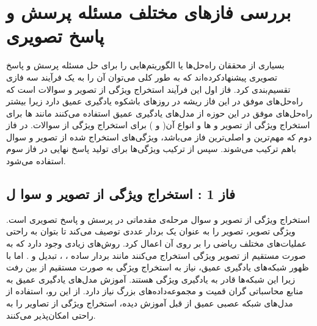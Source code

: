 \section{بررسی فازهای مختلف مسئله پرسش و پاسخ تصویری}
{
بسیاری از محققان راه‌حل‌ها یا الگوریتم‌هایی را برای حل مسئله پرسش و پاسخ تصویری پیشنهاد‌کرده‌اند که به طور کلی می‌توان آن را به یک فرآیند سه فازی تقسیم‌بندی کرد. فاز اول این فرآیند استخراج ویژگی از تصویر و سوالات است که راه‌حل‌های موفق در این فاز ریشه در روزهای باشکوه یادگیری عمیق دارد زیرا بیشتر راه‌حل‌های موفق در این حوزه از مدل‌های یادگیری عمیق استفاده می‌کنند مانند 
 ها برای استخراج ویژگی از  تصویر و 
  ها و انواع آن(
  و
  ) برای استخراج ویژگی از سوالات. در فاز دوم که مهم‌ترین و اصلی‌ترین فاز می‌باشد، ویژگی‌های استخراج شده از تصویر و سوال باهم ترکیب می‌شوند. سپس از ترکیب ویژگی‌ها برای تولید پاسخ نهایی در فاز سوم استفاده می‌شود.
	\subsection{فاز 1 : استخراج ویژگی از تصویر و سوا ل}
	{
		استخراج ویژگی از تصویر و سوال مرحله‌ی مقدماتی در پرسش و پاسخ تصویری است. ویژگی تصویر، تصویر را به عنوان یک بردار عددی  توصیف می‌کند تا بتوان به راحتی عملیات‌های مختلف ریاضی را بر روی آن اعمال کرد. روش‌های زیادی وجود دارد که به صورت مستقیم از تصویر ویژگی استخراج می‌کنند مانند بردار ساده 
		،
		، تبدیل
		و 
		.
		اما با ظهور شبکه‌های یادگیری عمیق، نیاز به استخراج ویژگی به صورت مستقیم از بین رفت زیرا این شبکه‌ها قادر به یادگیری ویژگی هستند. آموزش مدل‌های یادگیری عمیق به منابع محاسباتی گران قمیت و مجموعه‌داده‌های بزرگ نیاز دارد. از این رو، استفاده از مدل‌های شبکه عصبی عمیق از قبل آموزش دیده، استخراج ویژگی‌ از تصاویر را به راحتی امکان‌پذیر می‌کنند. 
		
}}
